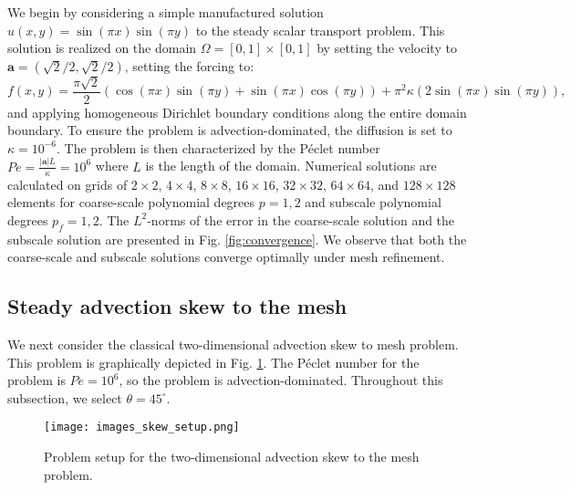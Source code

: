 \documentclass[11pt]{article}
\begin{document}
We begin by considering a simple manufactured solution $u\left(x,y\right) = \sin \left(\pi x \right) \sin \left( \pi y \right)$ to the steady scalar transport problem.   This solution is realized on the domain $\Omega = \left[0,1\right] \times \left[0,1\right]$ by setting the velocity to $\bm{a} = \left( \sqrt{2}/2, \sqrt{2}/2 \right)$, setting the forcing to:
\begin{equation}
f \left(x,y\right) = \frac{\pi \sqrt{2}}{2} \left( \cos \left( \pi x \right) \sin \left( \pi y \right) + \sin \left( \pi x \right) \cos \left( \pi y \right) \right) + \pi^2 \kappa \left( 2 \sin \left( \pi x \right) \sin \left( \pi y \right) \right),
\end{equation}
and applying homogeneous Dirichlet boundary conditions along the entire domain boundary.  To ensure the problem is advection-dominated, the diffusion is set to $\kappa = 10^{-6}$.  The problem is then characterized by the P\'{e}clet number $Pe = \frac{| \bm{a} | L}{\kappa} = 10^{6}$ where $L$ is the length of the domain.  Numerical solutions are calculated on grids of $2 \times 2$, $4 \times 4$, $8 \times 8$, $16 \times 16$, $32 \times 32$, $64 \times 64$, and $128 \times 128$ elements for coarse-scale polynomial degrees $p = 1, 2$ and subscale polynomial degrees $p_f = 1, 2$.  The $L^2$-norms of the error in the coarse-scale solution and the subscale solution are presented in Fig. \ref{fig:convergence}.  We observe that both the coarse-scale and subscale solutions converge optimally under mesh refinement.

\subsection{Steady advection skew to the mesh}

We next consider the classical two-dimensional advection skew to mesh problem.  This problem is graphically depicted in Fig. \ref{fig:skew_setup}.  The P\'{e}clet number for the problem is $Pe = 10^6$, so the problem is advection-dominated.  Throughout this subsection, we select $\theta = 45^{\circ}$.

\begin{figure}[b!]
\begin{center}
\texttt{[image: images\_skew\_setup.png]}
\caption{Problem setup for the two-dimensional advection skew to the mesh problem.}
\label{fig:skew_setup}
\end{center}
\end{figure}
\end{document}
